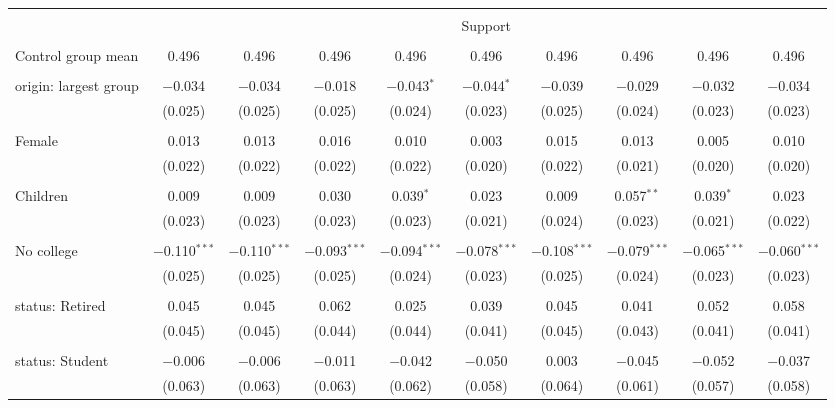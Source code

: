 
\begin{tabular}{@{\extracolsep{5pt}}lccccccccc} 
\\[-1.8ex]\hline 
\hline \\[-1.8ex] 
 & \multicolumn{9}{c}{Support} \\ 
\cline{2-10} 
\hline \\[-1.8ex] 
 Control group mean & 0.496 & 0.496 & 0.496 & 0.496 & 0.496 & 0.496 & 0.496 & 0.496 & 0.496  \\ \hline \\[-1.8ex] origin: largest group & $-$0.034 & $-$0.034 & $-$0.018 & $-$0.043$^{*}$ & $-$0.044$^{*}$ & $-$0.039 & $-$0.029 & $-$0.032 & $-$0.034 \\ 
  & (0.025) & (0.025) & (0.025) & (0.024) & (0.023) & (0.025) & (0.024) & (0.023) & (0.023) \\ 
  & & & & & & & & & \\ 
 Female & 0.013 & 0.013 & 0.016 & 0.010 & 0.003 & 0.015 & 0.013 & 0.005 & 0.010 \\ 
  & (0.022) & (0.022) & (0.022) & (0.022) & (0.020) & (0.022) & (0.021) & (0.020) & (0.020) \\ 
  & & & & & & & & & \\ 
 Children & 0.009 & 0.009 & 0.030 & 0.039$^{*}$ & 0.023 & 0.009 & 0.057$^{**}$ & 0.039$^{*}$ & 0.023 \\ 
  & (0.023) & (0.023) & (0.023) & (0.023) & (0.021) & (0.024) & (0.023) & (0.021) & (0.022) \\ 
  & & & & & & & & & \\ 
 No college & $-$0.110$^{***}$ & $-$0.110$^{***}$ & $-$0.093$^{***}$ & $-$0.094$^{***}$ & $-$0.078$^{***}$ & $-$0.108$^{***}$ & $-$0.079$^{***}$ & $-$0.065$^{***}$ & $-$0.060$^{***}$ \\ 
  & (0.025) & (0.025) & (0.025) & (0.024) & (0.023) & (0.025) & (0.024) & (0.023) & (0.023) \\ 
  & & & & & & & & & \\ 
 status: Retired & 0.045 & 0.045 & 0.062 & 0.025 & 0.039 & 0.045 & 0.041 & 0.052 & 0.058 \\ 
  & (0.045) & (0.045) & (0.044) & (0.044) & (0.041) & (0.045) & (0.043) & (0.041) & (0.041) \\ 
  & & & & & & & & & \\ 
 status: Student & $-$0.006 & $-$0.006 & $-$0.011 & $-$0.042 & $-$0.050 & 0.003 & $-$0.045 & $-$0.052 & $-$0.037 \\ 
  & (0.063) & (0.063) & (0.063) & (0.062) & (0.058) & (0.064) & (0.061) & (0.057) & (0.058) \\ 

\end{tabular}
